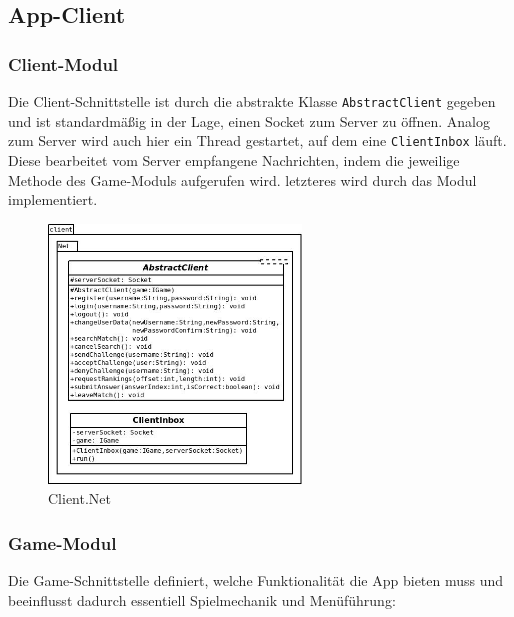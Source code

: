 \subsection{App-Client}
\subsubsection{Client-Modul}
Die Client-Schnittstelle ist durch die abstrakte Klasse \texttt{AbstractClient} gegeben und ist standardmäßig in der Lage, einen Socket zum Server zu öffnen. Analog zum Server wird auch hier ein Thread gestartet, auf dem eine \texttt{ClientInbox} läuft. Diese bearbeitet vom Server empfangene Nachrichten, indem die jeweilige Methode des Game-Moduls aufgerufen wird. letzteres wird durch das Modul implementiert.

\begin{figure}[H]
	\centering
	\begin{minipage}[t]{\textwidth}
		\includegraphics[width=0.6\textwidth]{Diagramme/client.jpeg}
		\caption{Client.Net}
		\label{Client.Net}
	\end{minipage}
\end{figure}

\newpage
\subsubsection{Game-Modul}
Die Game-Schnittstelle definiert, welche Funktionalität die App bieten muss und beeinflusst dadurch essentiell Spielmechanik und Menüführung:

